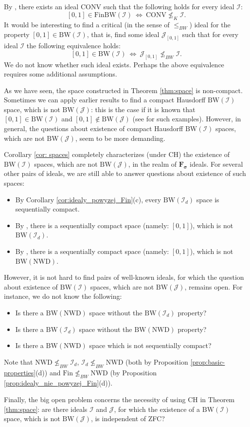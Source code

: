 \documentclass{amsart}
\theoremstyle{plain}
\theoremstyle{definition}
\theoremstyle{remark}
\newcommand{\cI}{\mathcal{I}}
\newcommand{\I}{\cI}
\newcommand{\cJ}{\mathcal{J}}
\newcommand{\J}{\cJ}
\newcommand{\Fin}{\mathrm{Fin}}
\newcommand{\nwd}{\mathrm{NWD}}
\newcommand{\conv}{\mathrm{CONV}}
\newcommand{\BW}{\mathrm{BW}}
\newcommand{\FinBW}{\mathrm{FinBW}}
\begin{document}
By \cite[Section 2.7]{alcantara-phd-thesis}, there exists an ideal $\conv$ such that the following holds for every ideal $\I$:
$$[0,1]\in\FinBW(\I)\ \iff\ \conv\not\leq_K\I.$$
It would be interesting to find a critical (in the sense of $\leq_{BW}$) ideal for the property $[0,1]\in\BW(\I)$, that is, find some ideal $\J_{[0,1]}$ such that for every ideal $\I$ the following equivalence holds:
$$[0,1]\in\BW(\I)\ \iff\ \J_{[0,1]}\not\leq_{BW}\I.$$
We do not know whether such ideal exists. Perhaps the above equivalence requires some additional assumptions.

As we have seen, the space constructed in Theorem \ref{thm:space} is non-compact. Sometimes we can apply earlier results to find a compact Hausdorff $\BW(\I)$ space, which is not $\BW(\J)$: this is the case if it is known that $[0,1]\in\BW(\I)$ and $[0,1]\notin\BW(\J)$ (see \cite{MR2320288} for such examples). However, in general, the questions about existence of compact Hausdorff $\BW(\I)$ spaces, which are not $\BW(\J)$, seem to be more demanding.

Corollary \ref{cor: spaces} completely characterizes (under CH) the existence of $\BW(\I)$ spaces, which are not $\BW(\J)$, in the realm of $\mathbf{F_\sigma}$ ideals. For several other pairs of ideals, we are still able to answer questions about existence of such spaces:
\begin{itemize}
    \item By Corollary \ref{cor:idealy_powyzej_Fin}(c), every $\BW(\I_d)$ space is sequentially compact.
    \item By \cite[Example 3]{MR1181163}, there is a sequentially compact space (namely: $[0,1]$), which is not $\BW(\I_d)$.
    \item By \cite[Example 3.1]{MR2320288}, there is a sequentially compact space (namely: $[0,1]$), which is not $\BW(\nwd)$.
\end{itemize}
However, it is not hard to find pairs of well-known ideals, for which the question about existence of $\BW(\I)$ spaces, which are not $\BW(\J)$, remains open. For instance, we do not know the following:
\begin{itemize}
    \item Is there a $\BW(\nwd)$ space without the $\BW(\I_d)$ property?
    \item Is there a $\BW(\I_d)$ space without the $\BW(\nwd)$ property?
    \item Is there a $\BW(\nwd)$ space which is not sequentially compact?
\end{itemize}
Note that $\nwd\not\leq_{BW}\I_d$, $\I_d\not\leq_{BW}\nwd$ (both by Proposition \ref{prop:basic-properties}(d)) and $\Fin\not\leq_{BW}\nwd$ (by Proposition \ref{prop:idealy_nie_powyzej_Fin}(d)). 

Finally, the big open problem concerns the necessity of using CH in Theorem \ref{thm:space}: are there ideals $\I$ and $\J$, for which the existence of a $\BW(\I)$ space, which is not $\BW(\J)$, is independent of ZFC?



\end{document}
